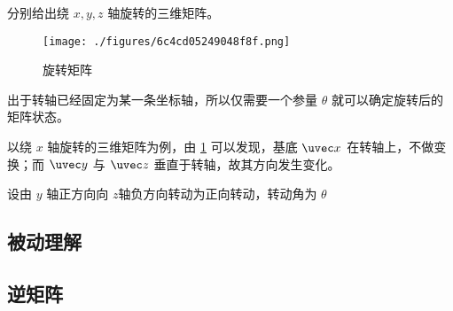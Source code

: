 \begin{example}{分别给出绕 $x,y,z$ 轴旋转的三维矩阵。}

\begin{figure}[ht]
\centering
\texttt{[image: ./figures/6c4cd05249048f8f.png]}
\caption{旋转矩阵} \label{fig_Rot3D_1}
\end{figure}

出于转轴已经固定为某一条坐标轴，所以仅需要一个参量 $\theta$ 就可以确定旋转后的矩阵状态。

以绕 $x$ 轴旋转的三维矩阵为例，由 \ref{fig_Rot3D_1} 可以发现，基底 $\uvec x$ 在转轴上，不做变换；而 $\uvec y$ 与 $\uvec z$ 垂直于转轴，故其方向发生变化。

设由 $y$ 轴正方向向 $z$轴负方向转动为正向转动，转动角为 $\theta$

\end{example}


\subsection{被动理解}


\subsection{逆矩阵}

